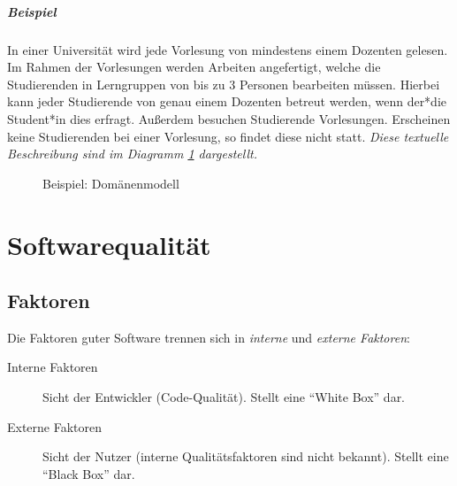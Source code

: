 \documentclass[a4paper, 11pt, accentcolor = tud3b]{tudreport}
\begin{document}
				\paragraph{Beispiel}
					In einer Universität wird jede Vorlesung von mindestens einem Dozenten gelesen. Im Rahmen der Vorlesungen werden Arbeiten angefertigt, welche die Studierenden in Lerngruppen von bis zu 3 Personen bearbeiten müssen. Hierbei kann jeder Studierende von genau einem Dozenten betreut werden, wenn der*die Student*in dies erfragt. Außerdem besuchen Studierende Vorlesungen. Erscheinen keine Studierenden bei einer Vorlesung, so findet diese nicht statt. \textit{Diese textuelle Beschreibung sind im Diagramm \ref{fig:domain} dargestellt.}

					\begin{figure}[ht]
						\centering
						\caption{Beispiel: Domänenmodell}
						\label{fig:domain}
					\end{figure}
	
	\chapter{Softwarequalität}
		\section{Faktoren}
			Die Faktoren guter Software trennen sich in \textit{interne} und \textit{externe Faktoren}:
			\begin{description}
				\item[Interne Faktoren] Sicht der Entwickler (Code-Qualität). Stellt eine \enquote{White Box} dar.
				\item[Externe Faktoren] Sicht der Nutzer (interne Qualitätsfaktoren sind nicht bekannt). Stellt eine \enquote{Black Box} dar.
			\end{description}
		
\end{document}
